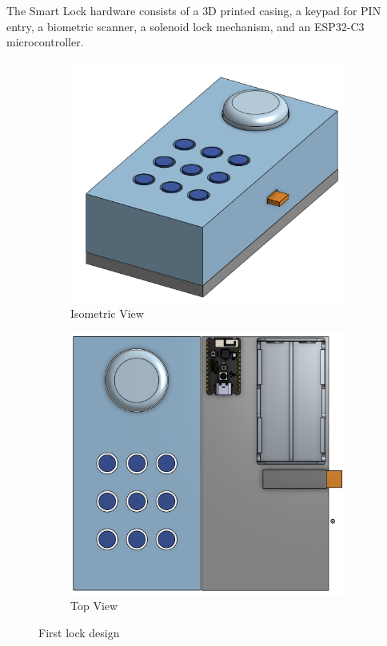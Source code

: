 The Smart Lock hardware consists of a 3D printed casing, a keypad for PIN entry, a biometric scanner, a solenoid lock mechanism, and an ESP32-C3 microcontroller.

\begin{figure}[htbp]
    \centering
    \begin{subfigure}[b]{0.48\textwidth}
        \includegraphics[width=\textwidth]{./img/isoView.png}
        \caption{Isometric View}
        \label{fig:isoView}
    \end{subfigure}
    \hfill
    \begin{subfigure}[b]{0.48\textwidth}
        \includegraphics[width=\textwidth]{./img/topView.png}
        \caption{Top View}
        \label{fig:topView}
    \end{subfigure}
    \caption{First lock design}
\end{figure}


